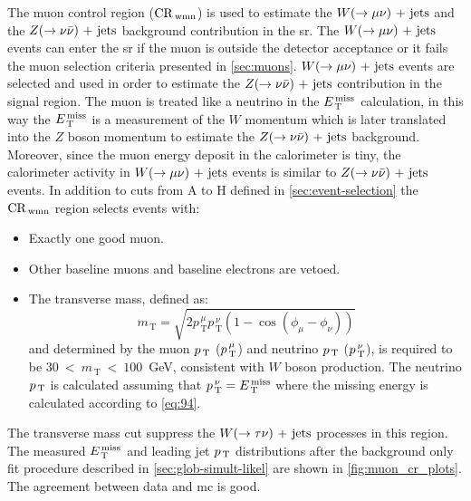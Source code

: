 The muon control region ($\mathrm{CR}_\mathrm{\, wmn}$) is used to estimate the $W (\rightarrow \mu \nu)\mathrm{~+~jets}$ and
the $Z (\rightarrow \nu \bar{\nu})\mathrm{~+~jets}$ background contribution in the \gls{sr}\@. The
$W (\rightarrow \mu \nu)\mathrm{~+~jets}$ events can enter the \gls{sr} if the muon is outside the
detector acceptance or it fails the muon selection criteria presented in
\cref{sec:muons}. $W (\rightarrow \mu \nu)\mathrm{~+~jets}$ events are selected and used in order to
estimate the $Z (\rightarrow \nu \bar{\nu})\mathrm{~+~jets}$ contribution in the signal region. The muon is
treated like a neutrino in the $E_\mathrm{\, T}^\mathrm{\, miss}$ calculation, in this way the $E_\mathrm{\, T}^\mathrm{\, miss}$ is a
measurement of the $W$ momentum which is later translated into the $Z$ boson
momentum to estimate the $Z (\rightarrow \nu \bar{\nu})\mathrm{~+~jets}$ background. Moreover, since the muon
energy deposit in the calorimeter is tiny, the calorimeter activity in
$W (\rightarrow \mu \nu)\mathrm{~+~jets}$ events is similar to $Z (\rightarrow \nu \bar{\nu})\mathrm{~+~jets}$ events. In addition to
cuts from A to H defined in \cref{sec:event-selection} the $\mathrm{CR}_\mathrm{\, wmn}$ region
selects events with:
\begin{itemize}
\item Exactly one good muon.
\item Other baseline muons and baseline electrons are vetoed.
\item The transverse mass, defined as:
  \begin{equation}
    \label{eq:99}
    m_\mathrm{\, T} = \sqrt{2 p_\mathrm{\, T}^{\, \mu} p_\mathrm{\, T}^{\, \nu}
      (1 - \cos(\phi_\mu - \phi_\nu))}
  \end{equation}
  and determined by the muon $p_\mathrm{\, T}$ ($p_\mathrm{\, T}^{\, \mu}$) and neutrino $p_\mathrm{\, T}$
  ($p_\mathrm{\, T}^{\, \nu}$), is required to be $30~<~m_\mathrm{\, T}~<~100$~GeV,
  consistent with $W$ boson production. The neutrino $p_\mathrm{\, T}$ is calculated
  assuming that $p_\mathrm{\, T}^{\, \nu} = E_\mathrm{\, T}^\mathrm{\, miss}$ where the missing energy is calculated
  according to \cref{eq:94}.
\end{itemize}
The transverse mass cut suppress the $W (\rightarrow \tau \nu)\mathrm{~+~jets}$ processes in this
region. The measured $E_\mathrm{\, T}^\mathrm{\, miss}$ and leading jet $p_\mathrm{\, T}$ distributions after the
background only fit procedure described in \cref{sec:glob-simult-likel} are
shown in
\cref{fig:muon_cr_plots}.
The agreement between data and \gls{mc} is good.
